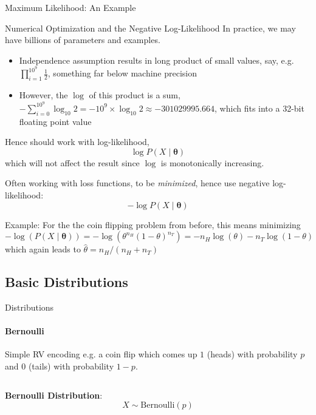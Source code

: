 {\begin{frame}{Maximum Likelihood: An Example}
    \end{frame}

    \begin{frame}{Numerical Optimization and the Negative Log-Likelihood}
        In practice, we may have billions of parameters and examples.
        \begin{itemize}
            \item Independence assumption results in long product of small values, say, e.g.
                  $\prod_{i=1}^{10^9} \frac12$, something far below machine precision
            \item However, the $\log$ of this product is a sum,
                  $-\sum_{i=0}^{10^9} \log_{10} 2 = -10^9 \times \log_{10} 2 \approx -301029995.664$,
                  which fits into a 32-bit floating point value
        \end{itemize}

        Hence should work with log-likelihood,
        $$\log P(X \mid \boldsymbol{\theta})$$
        which will not affect the result since $\log$ is monotonically increasing.

        Often working with loss functions, to be \emph{minimized}, hence use negative log-likelihood:
        $$-\log P(X \mid \boldsymbol{\theta})$$

        Example: For the the coin flipping problem from before, this means minimizing
        $$-\log(P(X \mid \boldsymbol{\theta})) = -\log(\theta^{n_H}(1-\theta)^{n_T}) = -n_H\log(\theta) - n_T\log(1-\theta)$$
        which again leads to $\hat{\theta} = n_H/(n_H + n_T)$
    \end{frame}

    \subsection{Basic Distributions}

    \begin{frame}{Distributions}
        \framesubtitle{Bernoulli}
        Simple RV encoding e.g. a coin flip which comes up $1$ (heads)
        with probability $p$ and $0$ (tails) with probability $1-p$.

        \vspace*{3mm}
        \begin{columns}[onlytextwidth]
            \begin{column}{0.5\textwidth}
                \begin{boxed}
                    \textbf{Bernoulli Distribution}:
                    $$X \sim \mathrm{Bernoulli}(p) $$


\end{boxed}
\end{column}
\end{columns}
\end{frame}}
